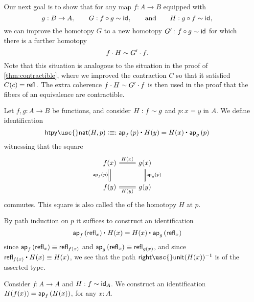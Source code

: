   Our next goal is to show that for any map $f:A\to B$ equipped with
  \begin{equation*}
    g:B\to A,\qquad G:f\circ g \htpy \idfunc,\qquad\text{and}\qquad H:g\circ f\htpy \idfunc,
  \end{equation*}
  we can improve the homotopy $G$ to a new homotopy $G':f\circ g\htpy \idfunc$ for which there is a further homotopy
  \begin{equation*}
    f\cdot H\htpy G'\cdot f.
  \end{equation*}
  Note that this situation is analogous to the situation in the proof of \cref{thm:contractible}, where we improved the contraction $C$ so that it satisfied $C(c)=\refl{}$. The extra coherence $f\cdot H\htpy G'\cdot f$ is then used in the proof that the fibers of an equivalence are contractible.

\begin{defn}\label{defn:htpy_nat}
Let $f,g:A\to B$ be functions, and consider $H:f\htpy g$ and $p:x=y$ in $A$. We define identification
\begin{equation*}
\mathsf{htpy\usc{}nat}(H,p) \defeq  :\ct{\ap{f}{p}}{H(y)}=\ct{H(x)}{\ap{g}{p}}
\end{equation*}
witnessing that the square
\begin{equation*}
\begin{tikzcd}
f(x) \arrow[r,equals,"H(x)"] \arrow[d,equals,swap,"\ap{f}{p}"] & g(x) \arrow[d,equals,"\ap{g}{p}"] \\
f(y) \arrow[r,equals,swap,"H(y)"] & g(y)
\end{tikzcd}
\end{equation*}
commutes. This square is also called the  of the homotopy $H$ at $p$.
\end{defn}

\begin{constr}
  By path induction on $p$ it suffices to construct an identification
  \begin{equation*}
    \ct{\ap{f}{\refl{x}}}{H(x)}=\ct{H(x)}{\ap{g}{\refl{x}}}
  \end{equation*}
  since $\ap{f}{\refl{x}}\jdeq \refl{f(x)}$ and $\ap{g}{\refl{x}}\jdeq\refl{g(x)}$, and since $\ct{\refl{f(x)}}{H(x)}\jdeq H(x)$, we see that the path $\mathsf{right\usc{}unit}(H(x))^{-1}$ is of the asserted type.
\end{constr}

\begin{defn}\label{defn:retraction_swap}
Consider $f:A\to A$ and $H: f\htpy \idfunc[A]$. We construct an identification $H(f(x))=\ap{f}{H(x)}$, for any $x:A$.
\end{defn}

